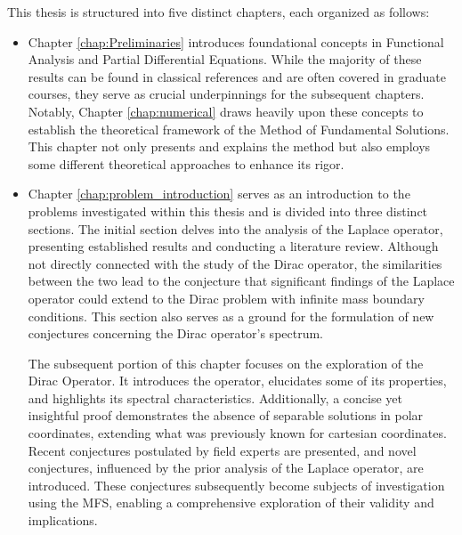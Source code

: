 This thesis is structured into five distinct chapters, each organized as follows:
\begin{itemize}
\item Chapter \ref{chap:Preliminaries} introduces foundational concepts in Functional Analysis and Partial Differential Equations. While the majority of these results can be found in classical references and are often covered in graduate courses, they serve as crucial underpinnings for the subsequent chapters. Notably, Chapter \ref{chap:numerical} draws heavily upon these concepts to establish the theoretical framework of the Method of Fundamental Solutions. This chapter not only presents and explains the method but also employs some different theoretical approaches to enhance its rigor.
\item Chapter \ref{chap:problem_introduction} serves as an introduction to the problems investigated within this thesis and is divided into three distinct sections. The initial section delves into the analysis of the Laplace operator, presenting established results and conducting a literature review. Although not directly connected with the study of the Dirac operator, the similarities between the two lead to the conjecture that significant findings of the Laplace operator could extend to the Dirac problem with infinite mass boundary conditions. This section also serves as a ground for the formulation of new conjectures concerning the Dirac operator's spectrum.

The subsequent portion of this chapter focuses on the exploration of the Dirac Operator. It introduces the operator, elucidates some of its properties, and highlights its spectral characteristics. Additionally, a concise yet insightful proof demonstrates the absence of separable solutions in polar coordinates, extending what was previously known for cartesian coordinates. Recent conjectures postulated by field experts are presented, and novel conjectures, influenced by the prior analysis of the Laplace operator, are introduced. These conjectures subsequently become subjects of investigation using the MFS, enabling a comprehensive exploration of their validity and implications.


\end{itemize}
